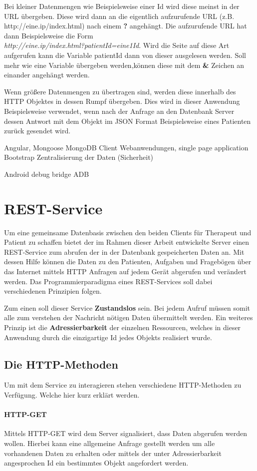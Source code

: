 Bei kleiner Datenmengen wie Beispielsweise einer Id wird diese meinst in der URL übergeben. Diese wird dann an die eigentlich aufzurufende URL (z.B. http://eine.ip/index.html) nach einem \textbf{?} angehängt.
Die aufzurufende URL hat dann Beispielsweise die Form \\ \textit{http://eine.ip/index.html?patientId=eine1Id}.
Wird die Seite auf diese Art aufgerufen kann die Variable patientId dann von dieser ausgelesen werden. Soll mehr wie eine Variable übergeben werden,können diese mit dem \textbf{\&} Zeichen an einander angehängt werden.

Wenn größere Datenmengen zu übertragen sind, werden diese innerhalb des HTTP Objektes in dessen Rumpf übergeben. Dies wird in dieser Anwendung Beispielsweise verwendet, wenn nach der Anfrage an den Datenbank Server dessen Antwort mit dem Objekt im JSON Format Beispielsweise eines Patienten zurück gesendet wird.

 Angular, Mongoose MongoDB
 Client Webanwendungen, single page application Bootstrap
 Zentralisierung der Daten (Sicherheit)
 
 Android debug bridge ADB
 
\section{REST-Service}
Um eine gemeinsame Datenbasis zwischen den beiden Clients für Therapeut und Patient zu schaffen bietet der im Rahmen dieser Arbeit entwickelte Server einen REST-Service zum abrufen der in der Datenbank gespeicherten Daten an. Mit dessen Hilfe können die Daten zu den Patienten, Aufgaben und Fragebögen über das Internet mittels HTTP Anfragen auf jedem Gerät abgerufen und verändert werden. Das Programmierparadigma eines REST-Services soll dabei verschiedenen Prinzipien folgen.

Zum einen soll dieser Service \textbf{Zustandslos} sein. Bei jedem Aufruf müssen somit alle zum verstehen der Nachricht nötigen Daten übermittelt werden.
Ein weiteres Prinzip ist die \textbf{Adressierbarkeit} der einzelnen Ressourcen, welches in dieser Anwendung durch die einzigartige Id jedes Objekts realisiert wurde.
\subsection{Die HTTP-Methoden}
Um mit dem Service zu interagieren stehen verschiedene HTTP-Methoden zu Verfügung. Welche hier kurz erklärt werden.
\paragraph{HTTP-GET}
Mittels HTTP-GET wird dem Server signalisiert, dass Daten abgerufen werden wollen. Hierbei kann eine allgemeine Anfrage gestellt werden um alle vorhandenen Daten zu erhalten oder mittels der unter Adressierbarkeit angesprochen Id ein bestimmtes Objekt angefordert werden.
